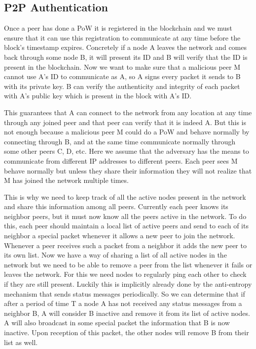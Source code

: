 \documentclass[twocolumn]{article}
\begin{document}
\subsection{P2P Authentication}
Once a peer has done a PoW it is registered in the blockchain and we must ensure that it can use this registration to communicate at any time before the block’s timestamp expires. Concretely if a node A leaves the network and comes back through some node B, it will present its ID and B will verify that the ID is present in the blockchain. Now we want to make sure that a malicious peer M cannot use A’s ID to communicate as A, so A signs every packet it sends to B with its private key. B can verify the authenticity and integrity of each packet with A’s public key which is present in the block with A’s ID.

This guarantees that A can connect to the network from any location at any time through any joined peer and that peer can verify that it is indeed A. But this is not enough because a malicious peer M could do a PoW and behave normally by connecting through B, and at the same time communicate normally through some other peers C, D, etc. Here we assume that the adversary has the means to communicate from different IP addresses to different peers. Each peer sees M behave normally but unless they share their information they will not realize that M has joined the network multiple times.

This is why we need to keep track of all the active nodes present in the network and share this information among all peers. Currently each peer knows its neighbor peers, but it must now know all the peers active in the network. To do this, each peer should maintain a local list of active peers and send to each of its neighbor a special packet whenever it allows a new peer to join the network. Whenever a peer receives such a packet from a neighbor it adds the new peer to its own list.
Now we have a way of sharing a list of all active nodes in the network but we need to be able to remove a peer from the list whenever it fails or leaves the network. For this we need nodes to regularly ping each other to check if they are still present. Luckily this is implicitly already done by the anti-entropy mechanism that sends status messages periodically. So we can determine that if after a period of time T a node A has not received any status messages from a neighbor B, A will consider B inactive and remove it from its list of active nodes. A will also broadcast in some special packet the information that B is now inactive. Upon reception of this packet, the other nodes will remove B from their list as well.
\end{document}
